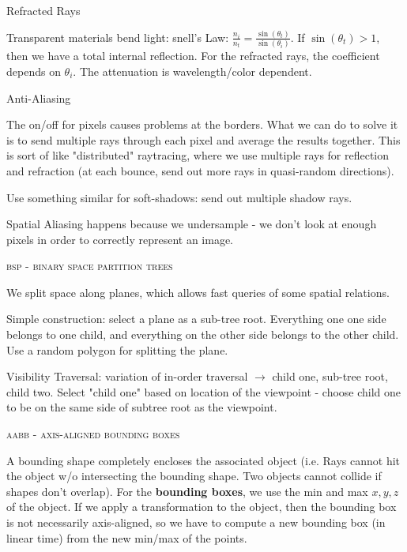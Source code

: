 \documentclass{article}
\begin{document}
\vspace{10pt}
Refracted Rays

Transparent materials bend light: snell's Law: $\frac{n_i}{n_t} = \frac{\sin(\theta_t)}{\sin(\theta_i)} $. If $\sin(\theta_t) > 1$, then we have a total internal reflection. For the refracted rays, the coefficient depends on $\theta_i$. The attenuation is wavelength/color dependent.

\vspace{10pt}
Anti-Aliasing

The on/off for pixels causes problems at the borders. What we can do to solve it is to send multiple rays through each pixel and average the results together. This is sort of like "distributed" raytracing, where we use multiple rays for reflection and refraction (at each bounce, send out more rays in quasi-random directions).

Use something similar for soft-shadows: send out multiple shadow rays.

Spatial Aliasing happens because we undersample - we don't look at enough pixels in order to correctly represent an image.
\begin{center}\textsc{bsp - binary space partition trees}\end{center} 
We split space along planes, which allows fast queries of some spatial relations.

Simple construction: select a plane as a sub-tree root. Everything one one side belongs to one child, and everything on the other side belongs to the other child. Use a random polygon for splitting the plane.

Visibility Traversal: variation of in-order traversal $\rightarrow$ child one, sub-tree root, child two. Select "child one" based on location of the viewpoint - choose child one to be on the same side of subtree root as the viewpoint.

\begin{center}\textsc{aabb - axis-aligned bounding boxes}\end{center} 
A bounding shape completely encloses the associated object (i.e. Rays cannot hit the object w/o intersecting the bounding shape. Two objects cannot collide if shapes don't overlap). For the {\bf bounding boxes}, we use the min and max $x,y,z$ of the object. If we apply a transformation to the object, then the bounding box is not necessarily axis-aligned, so we have to compute a new bounding box (in linear time) from the new min/max of the points.
\end{document}
